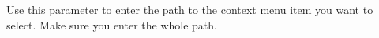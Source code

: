
Use this parameter to enter the path to the context menu item you want to select. Make sure you enter the whole path. 


